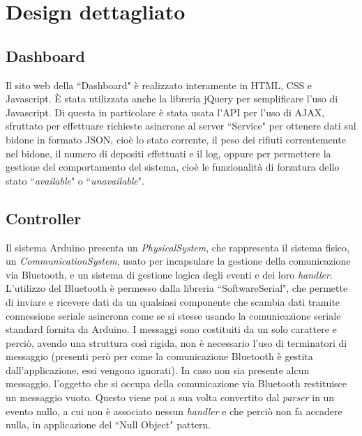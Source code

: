 \documentclass[a4paper, 12pt]{report}
\begin{document}
		\section{Design dettagliato}
			\subsection{Dashboard}
			Il sito web della ``Dashboard" è realizzato interamente in HTML, CSS e Javascript. È stata
			utilizzata anche la libreria jQuery per semplificare l'uso di Javascript. Di questa in
			particolare è stata usata l'API per l'uso di AJAX, sfruttato per effettuare richieste
			asincrone al server ``Service" per ottenere dati sul bidone in formato JSON, cioè lo stato corrente,
			il peso dei rifiuti correntemente nel bidone, il numero di depositi effettuati e il log,
			oppure per permettere la gestione del comportamento del sistema, cioè le
			funzionalità di forzatura dello stato ``\textit{available}" o ``\textit{unavailable}".
			\subsection{Controller}
			Il sistema Arduino presenta un \textit{PhysicalSystem}, che rappresenta il sistema fisico, 
			un \textit{CommunicationSystem}, usato per incapsulare la gestione della comunicazione via Bluetooth, 
			e un sistema di gestione logica degli eventi e dei loro \textit{handler}.\newline
			L'utilizzo del Bluetooth è permesso dalla libreria ``SoftwareSerial", che permette di inviare
			e ricevere dati da un qualsiasi componente che scambia dati tramite connessione seriale
			asincrona come se si stesse usando la comunicazione seriale standard fornita da Arduino.\newline 
			I messaggi sono costituiti da un solo carattere e perciò, avendo una struttura così
			rigida, non è necessario l'uso di terminatori di messaggio (presenti però per come la comunicazione
			Bluetooth è gestita dall'applicazione, essi vengono ignorati).\newline
			In caso non sia presente alcun messaggio, l'oggetto che si occupa della comunicazione via
			Bluetooth restituisce un messaggio vuoto. Questo viene poi a sua volta convertito dal
			\textit{parser} in un evento nullo, a cui non è associato nessun \textit{handler} e che
			perciò non fa accadere nulla, in applicazione del ``Null Object" pattern.
\end{document}
